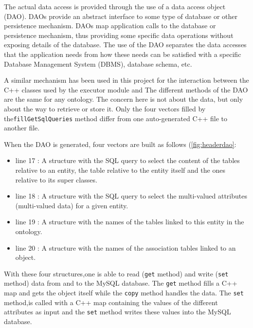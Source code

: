 The actual data access is provided through the use of a data access object (DAO).
DAOs provide an abstract interface to some type of database or other persistence
mechanism. DAOs map application calls to the database or persistence mechanism, 
thus providing some specific data operations without exposing
details of the database. The use of the DAO separates the data accesses that the application needs from how these needs can be satisfied with a specific
Database Management System (DBMS), database schema, etc.

A similar mechanism has been used in this project for the interaction between the C++ classes used by the executor module and 
The different methods of the DAO are the same for any ontology. 
The concern here is not about the data, but only about the way to retrieve or store it. Only the four vectors filled by the\texttt{fillGetSqlQueries} method differ from one 
auto-generated C++ file to another file.

When the DAO is generated, four vectors are built as follows (\ref{fig:headerdao}:

\begin{itemize}
\item line \textcolor{BrickRed}{17} : A structure with the SQL query to select the content of the tables relative to an entity, the table relative to the entity itself and the ones relative to its super classes.
\item line \textcolor{BrickRed}{18} : A structure with the SQL query to select the multi-valued attributes (multi-valued data) for a given entity.
\item line \textcolor{BrickRed}{19} : A structure with the names of the tables linked to this entity in the ontology.
\item line \textcolor{BrickRed}{20} : A structure with the names of the association tables linked to an object.
\end{itemize}

With these four structures,one is able to read (\texttt{get} method) and write (\texttt{set} method) data from and to the MySQL database. The \texttt{get} method fills 
a C++ map and gets the object itself while the \texttt{copy} method handles the data. The \texttt{set} method,is called with a C++ map containing the values of the 
different attributes as input and the \texttt{set} method writes these values into the MySQL database.


